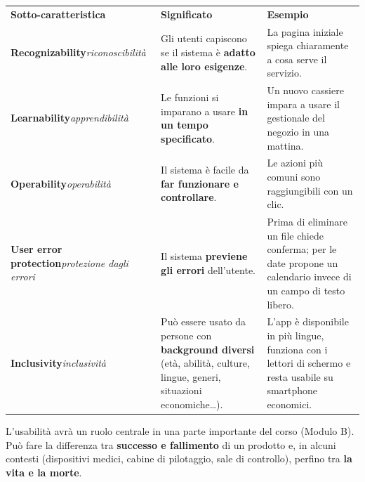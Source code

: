 

\begin{table}[H]
\centering
\renewcommand{\arraystretch}{1.4}
\begin{tabularx}{\textwidth}{P{3.6cm} L L}
\textbf{Sotto-caratteristica} & \textbf{Significato} & \textbf{Esempio} \\
\textbf{Recognizability}\newline\textit{\small riconoscibilità} & Gli utenti capiscono se il sistema è \textbf{adatto alle loro esigenze}. & La pagina iniziale spiega chiaramente a cosa serve il servizio. \\
\textbf{Learnability}\newline\textit{\small apprendibilità} & Le funzioni si imparano a usare \textbf{in un tempo specificato}. & Un nuovo cassiere impara a usare il gestionale del negozio in una mattina. \\
\textbf{Operability}\newline\textit{\small operabilità} & Il sistema è facile da \textbf{far funzionare e controllare}. & Le azioni più comuni sono raggiungibili con un clic. \\
\textbf{User error protection}\newline\textit{\small protezione dagli errori} & Il sistema \textbf{previene gli errori} dell'utente. & Prima di eliminare un file chiede conferma; per le date propone un calendario invece di un campo di testo libero. \\
\textbf{Inclusivity}\newline\textit{\small inclusività} & Può essere usato da persone con \textbf{background diversi} (età, abilità, culture, lingue, generi, situazioni economiche\ldots). & L'app è disponibile in più lingue, funziona con i lettori di schermo e resta usabile su smartphone economici. \\
\bottomrule
\end{tabularx}
\end{table}

L'usabilità avrà un ruolo centrale in una parte importante del corso (Modulo B). Può fare la differenza tra \textbf{successo e fallimento}
di un prodotto e, in alcuni contesti (dispositivi medici, cabine di pilotaggio, sale di controllo), perfino tra \textbf{la vita e la morte}.

